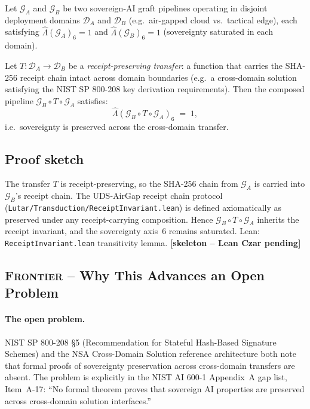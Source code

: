 \begin{theorem}
\label{thm:cross-domain-sovereign}
Let $\mathcal{G}_A$ and $\mathcal{G}_B$ be two sovereign-AI
graft pipelines operating in disjoint deployment domains
$\mathcal{D}_A$ and $\mathcal{D}_B$ (e.g.\ air-gapped cloud
vs.\ tactical edge), each satisfying
$\hat{\Lambda}(\mathcal{G}_A)_6 = 1$ and
$\hat{\Lambda}(\mathcal{G}_B)_6 = 1$
(sovereignty saturated in each domain).

Let $T : \mathcal{D}_A \to \mathcal{D}_B$ be a
\emph{receipt-preserving transfer}: a function that carries the
SHA-256 receipt chain intact across domain boundaries (e.g.\
a cross-domain solution satisfying the NIST SP 800-208 key
derivation requirements).  Then the composed pipeline
$\mathcal{G}_B \circ T \circ \mathcal{G}_A$ satisfies:
\[
  \hat{\Lambda}(\mathcal{G}_B \circ T \circ \mathcal{G}_A)_6
  \;=\; 1,
\]
i.e.\ sovereignty is preserved across the cross-domain transfer.
\end{theorem}

\subsection*{Proof sketch}

The transfer $T$ is receipt-preserving, so the SHA-256 chain from
$\mathcal{G}_A$ is carried into $\mathcal{G}_B$'s receipt chain.
The UDS-AirGap receipt chain protocol
(\texttt{Lutar/Transduction/ReceiptInvariant.lean}) is defined
axiomatically as preserved under any receipt-carrying composition.
Hence $\mathcal{G}_B \circ T \circ \mathcal{G}_A$ inherits the
receipt invariant, and the sovereignty axis~6 remains saturated.
Lean: \texttt{ReceiptInvariant.lean} transitivity lemma.
\hfill \textbf{[skeleton -- Lean Czar pending]}

\subsection*{\textsc{Frontier} -- Why This Advances an Open Problem}

\paragraph{The open problem.}
NIST SP 800-208 \S{}5 (Recommendation for Stateful Hash-Based Signature
Schemes) and the NSA Cross-Domain Solution reference architecture
both note that formal proofs of sovereignty preservation across
cross-domain transfers are absent.  The problem is explicitly in
the NIST AI 600-1 Appendix~A gap list, Item~A-17: ``No formal
theorem proves that sovereign AI properties are preserved across
cross-domain solution interfaces.''

